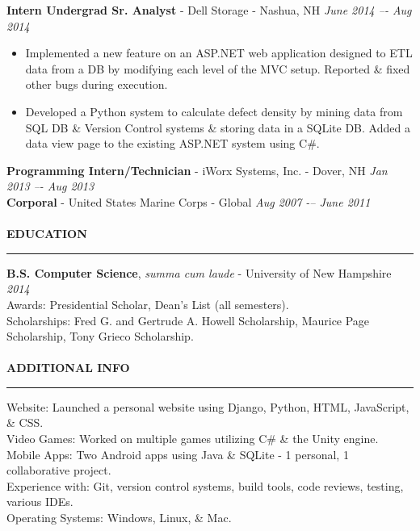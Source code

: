 \documentclass[a4paper,10pt]{article}
\begin{document}
\textbf{Intern Undergrad Sr. Analyst} - Dell Storage - Nashua, NH
\hfill
\textit{June 2014 –- Aug 2014}
\begin{itemize}
\item Implemented a new feature on an ASP.NET web application designed to ETL data from a DB by modifying each level of the MVC setup. Reported \& fixed other bugs during execution.
\item Developed a Python system to calculate defect density by mining data from SQL DB \& Version Control systems \& storing data in a SQLite DB. Added a data view page to the existing ASP.NET system using C\#.
\end{itemize}
\textbf{Programming Intern/Technician} - iWorx Systems, Inc. - Dover, NH
\hfill
\textit{Jan 2013 –- Aug 2013}\\
\textbf{Corporal} - United States Marine Corps - Global
\hfill
\textit{Aug 2007 -– June 2011}\\
\\

\textbf{EDUCATION}\\
\noindent\rule{\linewidth}{0.4pt}
\textbf{B.S. Computer Science}, \textit{summa cum laude} - University of New Hampshire
\hfill
\textit{2014}\\
Awards:             Presidential Scholar, Dean’s List (all semesters).\\
Scholarships:     Fred G. and Gertrude A. Howell Scholarship, Maurice Page Scholarship, Tony Grieco Scholarship.\\
\\

\textbf{ADDITIONAL INFO}\\
\noindent\rule{\linewidth}{0.4pt}
Website:                   Launched a personal website using Django, Python, HTML, JavaScript, \& CSS.\\
Video Games:
\indent
Worked on multiple games utilizing C\# \& the Unity engine.\\
Mobile Apps:
\indent
Two Android apps using Java \& SQLite - 1 personal, 1 collaborative project.\\
Experience with:
\indent
Git, version control systems, build tools, code reviews, testing, various IDEs.\\
Operating Systems:
\indent
Windows, Linux, \& Mac.\\
\end{document}
